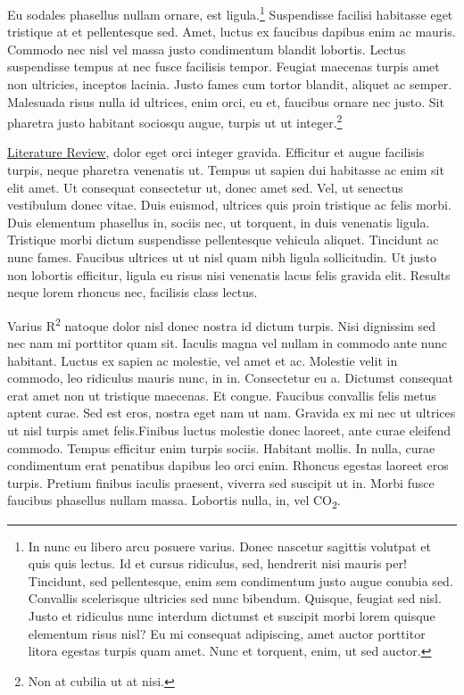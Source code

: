 \documentclass[
]{article}
\begin{document}
Eu sodales phasellus nullam ornare, est ligula.\footnote{In nunc eu
  libero arcu posuere varius. Donec nascetur sagittis volutpat et quis
  quis lectus. Id et cursus ridiculus, sed, hendrerit nisi mauris per!
  Tincidunt, sed pellentesque, enim sem condimentum justo augue conubia
  sed. Convallis scelerisque ultricies sed nunc bibendum. Quisque,
  feugiat sed nisl. Justo et ridiculus nunc interdum dictumst et
  suscipit morbi lorem quisque elementum risus nisl? Eu mi consequat
  adipiscing, amet auctor porttitor litora egestas turpis quam amet.
  Nunc et torquent, enim, ut sed auctor.} Suspendisse facilisi habitasse
eget tristique at et pellentesque sed. Amet, luctus ex faucibus dapibus
enim ac mauris. Commodo nec nisl vel massa justo condimentum blandit
lobortis. Lectus suspendisse tempus at nec fusce facilisis tempor.
Feugiat maecenas turpis amet non ultricies, inceptos lacinia. Justo
fames cum tortor blandit, aliquet ac semper. Malesuada risus nulla id
ultrices, enim orci, eu et, faucibus ornare nec justo. Sit pharetra
justo habitant sociosqu augue, turpis ut ut integer.\footnote{Non at
  cubilia ut at nisi.}

\protect\hyperlink{literature-review}{Literature Review}, dolor eget
orci integer gravida. Efficitur et augue facilisis turpis, neque
pharetra venenatis ut. Tempus ut sapien dui habitasse ac enim sit elit
amet. Ut consequat consectetur ut, donec amet sed. Vel, ut senectus
vestibulum donec vitae. Duis euismod, ultrices quis proin tristique ac
felis morbi. Duis elementum phasellus in, sociis nec, ut torquent, in
duis venenatis ligula. Tristique morbi dictum suspendisse pellentesque
vehicula aliquet. Tincidunt ac nunc fames. Faucibus ultrices ut ut nisl
quam nibh ligula sollicitudin. Ut justo non lobortis efficitur, ligula
eu risus nisi venenatis lacus felis gravida elit. Results neque lorem
rhoncus nec, facilisis class lectus.

Varius R\textsuperscript{2} natoque dolor nisl donec nostra id dictum
turpis. Nisi dignissim sed nec nam mi porttitor quam sit. Iaculis magna
vel nullam in commodo ante nunc habitant. Luctus ex sapien ac molestie,
vel amet et ac. Molestie velit in commodo, leo ridiculus mauris nunc, in
in. Consectetur eu a. Dictumst consequat erat amet non ut tristique
maecenas. Et congue. Faucibus convallis felis metus aptent curae. Sed
est eros, nostra eget nam ut nam. Gravida ex mi nec ut ultrices ut nisl
turpis amet felis.Finibus luctus molestie donec laoreet, ante curae
eleifend commodo. Tempus efficitur enim turpis sociis. Habitant mollis.
In nulla, curae condimentum erat penatibus dapibus leo orci enim.
Rhoncus egestas laoreet eros turpis. Pretium finibus iaculis praesent,
viverra sed suscipit ut in. Morbi fusce faucibus phasellus nullam massa.
Lobortis nulla, in, vel CO\textsubscript{2}.
\end{document}
